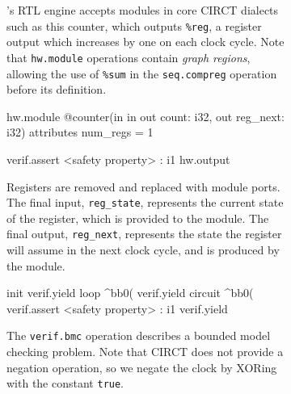 \documentclass[acmsmall,screen,review]{acmart}
\begin{document}
\begin{figure}
  \begin{subfigure}[t]{0.44\textwidth}
  \caption{\toolname{}'s RTL engine accepts modules in core CIRCT dialects such as this counter, which outputs \texttt{\%reg}, a register output which increases by one on each clock cycle. Note that \texttt{hw.module} operations contain \emph{graph regions}, allowing the use of \texttt{\%sum}
   in the \texttt{seq.compreg} operation before its definition.}
  \label{lst:counter}
  \end{subfigure}
  \hfill
  \begin{subfigure}[t]{0.44\textwidth}
  \begin{xdsl}
  hw.module @counter(in %
      in %
      out count: i32, out reg_next: i32)
      attributes {num_regs = 1} {
    verif.assert <safety property> : i1
    hw.output %
     
    }
  \end{xdsl}
  \caption{Registers are removed and replaced with module ports. The final input, \texttt{reg\_state}, represents the current state of the register, which is provided to the module. The final output, \texttt{reg\_next}, represents the state the register will assume in the next clock cycle, and is produced by the module.}
  \label{lst:counter-ext-regs}
  \end{subfigure}
  \noindent\begin{subfigure}[t]{0.44\textwidth}
  \begin{xdsl}
  
    init {
      verif.yield %
    } loop {
    ^bb0(%
      verif.yield %
    } circuit {
    ^bb0(%
      verif.assert <safety property> : i1
      verif.yield %
    }
  \end{xdsl}
  \caption{The \texttt{verif.bmc} operation describes a bounded model checking problem. Note that CIRCT does not provide a negation operation, so we negate the clock by XORing with the constant \texttt{true}.}
    \label{lst:counter-bmc-op}
  \end{subfigure}
  \hfill
  \noindent\begin{subfigure}[t]{0.44\textwidth}
  \begin{xdsl}
  

\end{xdsl}
\end{subfigure}
\end{figure}
\end{document}
